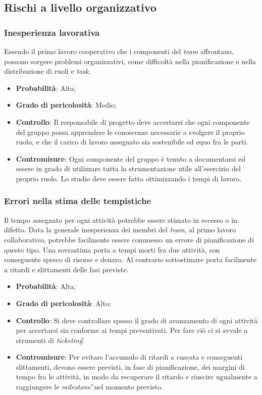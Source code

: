 \subsection{Rischi a livello organizzativo}

\subsubsection{Inesperienza lavorativa}
\label{sec:IneLav}
Essendo il primo lavoro cooperativo che i componenti del \textit{team} affrontano, possono sorgere problemi organizzativi, come difficoltà nella pianificazione e nella distribuzione di ruoli e \textit{task}. 
\begin{itemize}
\item \textbf{Probabilità}: Alta;
\item \textbf{Grado di pericolosità}: Medio;
\item \textbf{Controllo}: Il responsabile di progetto deve accertarsi che ogni componente del gruppo possa apprendere le conoscenze necessarie a svolgere il proprio ruolo, e che il carico di lavoro assegnato sia sostenibile ed equo fra le parti.
\item \textbf{Contromisure}: Ogni componente del gruppo è tenuto a documentarsi ed essere in grado di utilizzare tutta la strumentazione utile all'esercizio del proprio ruolo. Lo studio deve essere fatto ottimizzando i tempi di lavoro.
\end{itemize} 

\subsubsection{Errori nella stima delle tempistiche}
\label{sec:ErrTemp}
Il tempo assegnato per ogni attività potrebbe essere stimato in eccesso o in difetto. Data la generale inesperienza dei membri del \textit{team}, al primo lavoro collaborativo, potrebbe facilmente essere commesso un errore di pianificazione di questo tipo. Una sovrastima porta a tempi morti fra due attività, con conseguente spreco di risorse e denaro. Al contrario sottostimare porta facilmente a ritardi e slittamenti delle fasi previste.
\begin{itemize}
\item \textbf{Probabilità}: Alta;
\item \textbf{Grado di pericolosità}: Alto;
\item \textbf{Controllo}: Si deve controllare spesso il grado di avanzamento di ogni attività per accertarsi sia conforme ai tempi preventivati. Per fare ciò ci si avvale a strumenti di \textit{ticketing}\G.
\item \textbf{Contromisure}: Per evitare l'accumulo di ritardi a cascata e conseguenti slittamenti, devono essere previsti, in fase di pianificazione, dei margini di tempo fra le attività, in modo da recuperare il ritardo e riuscire ugualmente a raggiungere le \textit{milestone}\G\ nel momento previsto. 
\end{itemize}

